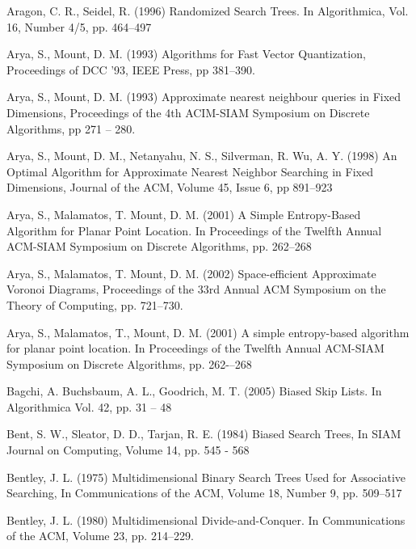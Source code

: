 \documentclass[mcs]{scsthesis}
\begin{document}

\begin{thebibliography}{5}

Aragon, C. R.,  Seidel, R. (1996) Randomized Search Trees.
In Algorithmica, Vol. 16, Number 4/5, pp. 464--497

Arya, S., Mount, D. M. (1993) Algorithms for Fast Vector Quantization,
Proceedings of DCC '93, IEEE Press, pp 381--390. 

Arya, S., Mount, D. M. (1993) Approximate nearest neighbour queries in Fixed
Dimensions, Proceedings of the 4th ACIM-SIAM Symposium on Discrete Algorithms,
pp 271 -- 280.

Arya, S., Mount, D. M., Netanyahu, N. S., Silverman, R. Wu, A. Y. (1998)
An Optimal Algorithm for Approximate Nearest Neighbor Searching in Fixed
Dimensions, Journal of the ACM, Volume 45, Issue 6, pp 891--923

Arya, S., Malamatos, T. Mount, D. M. (2001) A Simple Entropy-Based Algorithm
for Planar Point Location. In Proceedings of the Twelfth Annual ACM-SIAM
Symposium on Discrete Algorithms, pp. 262--268

Arya, S., Malamatos, T. Mount, D. M. (2002) Space-efficient Approximate
Voronoi Diagrams, Proceedings of the 33rd Annual ACM Symposium on the Theory
of Computing, pp. 721--730.

Arya, S., Malamatos, T., Mount, D. M. (2001) A simple entropy-based algorithm for planar point location.
In Proceedings of the Twelfth Annual ACM-SIAM Symposium on Discrete Algorithms,
pp. 262-–268

Bagchi, A. Buchsbaum, A. L., Goodrich, M. T. (2005) Biased Skip Lists.
In Algorithmica Vol. 42, pp. 31 – 48

Bent, S. W., Sleator, D. D., Tarjan, R. E. (1984) Biased Search Trees,
In SIAM Journal on Computing, Volume 14, pp. 545 - 568

Bentley, J. L. (1975) Multidimensional Binary Search Trees Used for Associative
Searching, In Communications of the ACM, Volume 18, Number 9, pp. 509--517 

Bentley, J. L. (1980) Multidimensional Divide-and-Conquer.
In Communications of the ACM, Volume 23, pp. 214--229.


\end{thebibliography}
\end{document}
